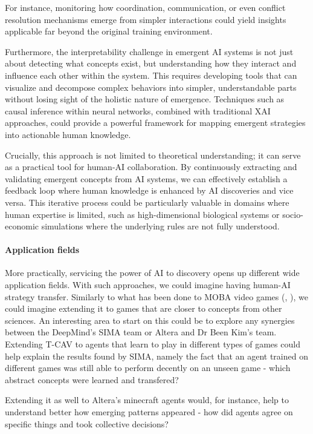 \documentclass[11pt]{article}
\begin{document}
For instance, monitoring how coordination, communication, or even conflict resolution mechanisms emerge from simpler interactions could yield insights applicable far beyond the original training environment.

Furthermore, the interpretability challenge in emergent AI systems is not just about detecting what concepts exist, but understanding how they interact and influence each other within the system. This requires developing tools that can visualize and decompose complex behaviors into simpler, understandable parts without losing sight of the holistic nature of emergence. Techniques such as causal inference within neural networks, combined with traditional XAI approaches, could provide a powerful framework for mapping emergent strategies into actionable human knowledge.

Crucially, this approach is not limited to theoretical understanding; it can serve as a practical tool for human-AI collaboration. By continuously extracting and validating emergent concepts from AI systems, we can effectively establish a feedback loop where human knowledge is enhanced by AI discoveries and vice versa. This iterative process could be particularly valuable in domains where human expertise is limited, such as high-dimensional biological systems or socio-economic simulations where the underlying rules are not fully understood.



\paragraph{Application fields} More practically, servicing the power of AI to discovery opens up different wide application fields.
With such approaches, we could imagine having human-AI strategy transfer. Similarly to what has been done to MOBA video games (\cite{openai_five}, \cite{fair_starcraft}), we could imagine extending it to games that are closer to concepts from other sciences.
An interesting area to start on this could be to explore any synergies between the DeepMind's SIMA team \cite{sima} or Altera \cite{altera} and Dr Been Kim's team. Extending T-CAV to agents that learn to play in different types of games could help explain the results found by SIMA, namely the fact that an agent trained on different games was still able to perform decently on an unseen game - which abstract concepts were learned and transfered?

Extending it as well to Altera's minecraft agents \cite{altera} would, for instance, help to understand better how emerging patterns appeared - how did agents agree on specific things and took collective decisions? 
\end{document}
